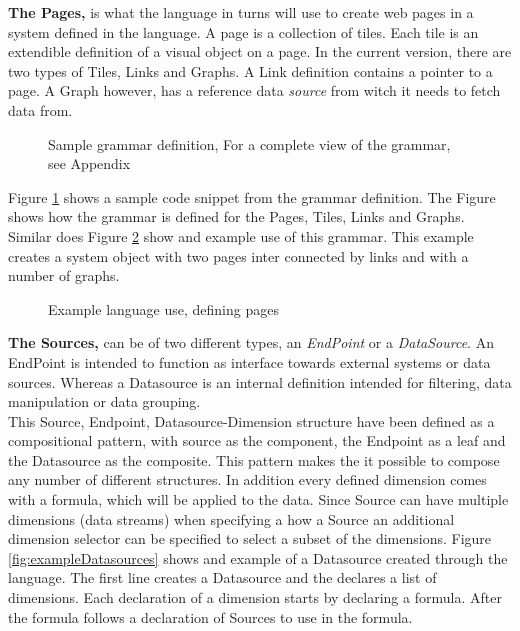 \textbf{The Pages,} is what the language in turns will use to create web pages in a system defined in the language.
A page is a collection of tiles. 
Each tile is an extendible definition of a visual object on a page.
In the current version, there are two types of Tiles, Links and Graphs.
A Link definition contains a pointer to a page. 
A Graph however, has a reference data \textit{source} from witch it needs to fetch data from.
\begin{figure}
\begin{center}

\end{center}
\caption{Sample grammar definition, For a complete view of the grammar, see Appendix }
\label{fig:grammadefinition}
\end{figure}
Figure \ref{fig:grammadefinition} shows a sample code snippet from the grammar definition.
The Figure shows how the grammar is defined for the Pages, Tiles, Links and Graphs.
Similar does Figure \ref{fig:examplePages} show and example use of this grammar. 
This example creates a system object with two pages inter connected by links and with a number of graphs.
\begin{figure}
\begin{center}

\end{center}
\caption{Example language use, defining pages}
\label{fig:examplePages}
\end{figure}

\textbf{The Sources, } can be of two different types, an \textit{EndPoint} or a \textit{DataSource}.
An EndPoint is intended to function as interface towards external systems or data sources. 
Whereas a Datasource is an internal definition intended for filtering, data manipulation or data grouping.\\
This Source, Endpoint, Datasource-Dimension structure have been defined as a compositional pattern, with source as the component, the Endpoint as a leaf and the Datasource as the composite.
This pattern makes the it possible to compose any number of different structures.
In addition every defined dimension comes with a formula, which will be applied to the data.
Since Source can have multiple dimensions (data streams) when specifying a how a Source an additional dimension selector can be specified to select a subset of the dimensions.
Figure \ref{fig:exampleDatasources} shows and example of a Datasource created through the language. 
The first line creates a Datasource and the declares a list of dimensions. 
Each declaration of a dimension starts by declaring a formula. After the formula follows a declaration of Sources to use in the formula. 

